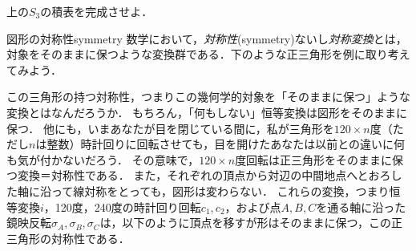 \documentclass[11pt,a4paper]{jsarticle}
\begin{document}
\begin{renshu}{}{}
    上の$S_3$の積表を完成させよ．
\end{renshu}

\begin{rei}{図形の対称性}{symmetry}
    数学において，\emph{対称性}(symmetry)ないし\emph{対称変換}とは，対象をそのままに保つような変換群である．下のような正三角形を例に取り考えてみよう．
    \begin{center}
    \end{center}
    この三角形の持つ対称性，つまりこの幾何学的対象を「そのままに保つ」ような変換とはなんだろうか．
    もちろん，「何もしない」恒等変換は図形をそのままに保つ．
    他にも，いまあなたが目を閉じている間に，私が三角形を$120\times n$度（ただし$n$は整数）時計回りに回転させても，目を開けたあなたは以前との違いに何も気が付かないだろう．
    その意味で，$120\times n$度回転は正三角形をそのままに保つ変換＝対称性である．
    また，それぞれの頂点から対辺の中間地点へとおろした軸に沿って線対称をとっても，図形は変わらない．
    これらの変換，つまり恒等変換$i$，120度，240度の時計回り回転$c_1, c_2$，および点$A, B, C$を通る軸に沿った鏡映反転$\sigma_A, \sigma_B, \sigma_C$は，以下のように頂点を移すが形はそのままに保つ，この正三角形の対称性である．
    \begin{center}
\end{center}
\end{rei}
\end{document}
